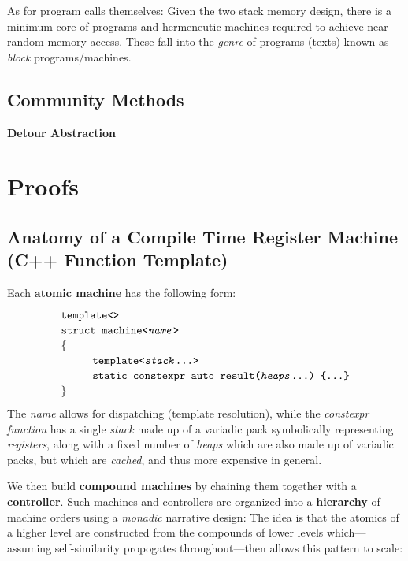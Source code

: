 \documentclass[twoside]{article}
\newcommand{\strong}[1]{{\bfseries #1}}
\newcommand{\tab}[1][1.125cm]{\hspace{#1}}
\begin{document}
As for program calls themselves: Given the two stack memory design, there is a minimum core of programs and hermeneutic
machines required to achieve near-random memory access. These fall into the \emph{genre} of programs (texts) known
as \emph{block} programs/machines.

\subsection*{Community Methods}

\strong{Detour Abstraction}

\section*{Proofs}

\subsection*{Anatomy of a Compile Time Register Machine (C++ Function Template)}

\noindent Each \strong{atomic machine} has the following form:
$$ \def\arraystretch{1.15}
\tab[0cm] \begin{array}{l}
\texttt{template<>}									\\
\texttt{struct machine<\emph{name}>}							\\
\{											\\
\tab[1cm]\texttt{template<\emph{stack}\ldots>}						\\
\tab[1cm]\texttt{static constexpr auto result(\emph{heaps}\ldots)\ \{\ldots\}}		\\
\}
\end{array} $$
The \emph{name} allows for dispatching (template resolution), while the \emph{constexpr function}
has a single \emph{stack} made up of a variadic pack symbolically representing \emph{registers},
along with a fixed number of \emph{heaps} which are also made up of variadic packs, but which
are \emph{cached}, and thus more expensive in general.

We then build \strong{compound machines} by chaining them together with a \strong{controller}.
Such machines and controllers are organized into a \strong{hierarchy} of machine orders using
a \emph{monadic} narrative design: The idea is that the atomics of a higher level are constructed
from the compounds of lower levels which---assuming self-similarity propogates throughout---then
allows this pattern to scale:
\end{document}
